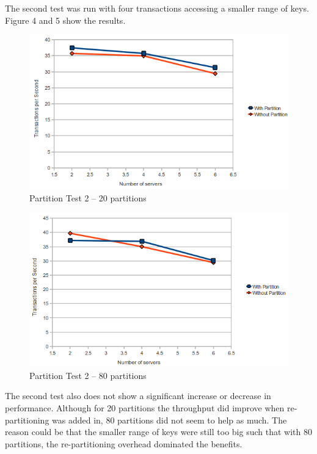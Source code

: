 \documentclass[a4paper, 10pt, notitlepage]{report}
\begin{document}
The second test was run with four transactions accessing a smaller range of keys. Figure 4 and 5 show the results.

\begin{figure}[h!]

  \centering
    \includegraphics[scale=0.7]{peval3.png}
  \caption{Partition Test 2 -- 20 partitions}
\end{figure}

\begin{figure}[h!]

  \centering
    \includegraphics[scale=0.7]{peval4.png}
  \caption{Partition Test 2 -- 80 partitions}
\end{figure}

The second test also does not show a significant increase or decrease in performance. Although for 20 partitions 
the throughput did improve when re-partitioning was added in, 80 partitions did not seem to help as much. The reason
could be that the smaller range of keys were still too big such that with 80 partitions, the re-partitioning
overhead dominated the benefits.
\end{document}
